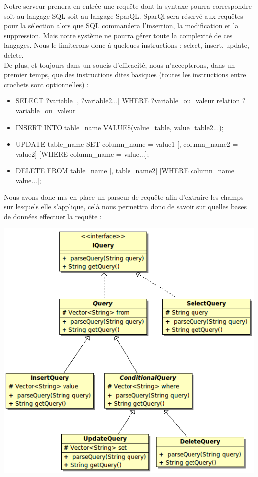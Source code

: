 \documentclass[12pt]{article}
\begin{document}
	Notre serveur prendra en entrée une requête dont la syntaxe pourra correspondre soit au langage SQL soit au langage SparQL. SparQl sera réservé aux requêtes pour la sélection alors que SQL commandera l'insertion, la modification et la suppression. Mais notre système ne pourra gérer toute la complexité de ces langages. Nous le limiterons donc à quelques instructions : select, insert, update, delete.\\
	De plus, et toujours dans un soucis d'efficacité, nous n'accepterons, dans un premier temps, que des instructions dites basiques (toutes les instructions entre crochets sont optionnelles) :\\
	\begin{itemize}
	\item SELECT ?variable [, ?variable2...] WHERE {?variable\_ou\_valeur relation ?variable\_ou\_valeur}\\
	\item INSERT INTO table\_name VALUES(value\_table, value\_table2...);\\
	\item UPDATE table\_name SET column\_name = value1 [, column\_name2  = value2] [WHERE column\_name = value...];\\
	\item DELETE FROM table\_name [, table\_name2] [WHERE column\_name = value...];\\
	\end{itemize}
	\newpage
	Nous avons donc mis en place un parseur de requête afin d'extraire les champs sur lesquels elle s'applique, celà nous permettra donc de savoir sur quelles bases de données effectuer 
	la requête :\\

\begin{center}
	\includegraphics[scale=0.70]{images/QueryHierarchie.png}
\end{center}
\end{document}
